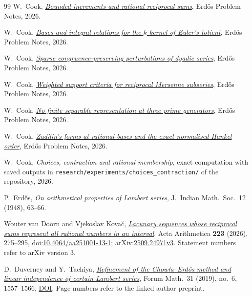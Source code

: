 \documentclass[11pt]{article}
\begin{document}
\begin{thebibliography}{99}
 W.~Cook,
  \href{erdos-243-reciprocal-tail-rigidity.pdf}{\emph{Bounded
  increments and rational reciprocal sums}}, Erd\H{o}s Problem Notes, 2026.

 W.~Cook,
  \href{erdos-249-binary-totient-series.pdf}{\emph{Bases and
  integral relations for the $k$-kernel of Euler's totient}}, Erd\H{o}s Problem
  Notes, 2026.

 W.~Cook,
  \href{erdos-251-prime-gap-dyadic-series.pdf}{\emph{Sparse
  congruence-preserving perturbations of dyadic series}}, Erd\H{o}s Problem
  Notes, 2026.

 W.~Cook,
  \href{erdos-257-mersenne-support-subseries.pdf}{\emph{Weighted
  support criteria for reciprocal Mersenne subseries}}, Erd\H{o}s Problem Notes,
  2026.

 W.~Cook,
  \href{erdos-269-three-prime-running-lcm.pdf}{\emph{No
  finite separable representation at three prime generators}}, Erd\H{o}s Problem
  Notes, 2026.

 W.~Cook,
  \href{erdos-1049-rational-base-lambert.pdf}{\emph{Zudilin's
  forms at rational bases and the exact normalised Hankel order}}, Erd\H{o}s
  Problem Notes, 2026.

 W.~Cook,
  \emph{Choices, contraction and rational membership}, exact computation with saved outputs in \texttt{research/experiments/choices\_contraction/} of the repository,
  2026.

 P.~Erd\H{o}s, \emph{On arithmetical properties of Lambert
  series}, J.~Indian Math.\ Soc.\ 12 (1948), 63--66.

 Wouter van Doorn and Vjekoslav Kova\v{c}, \href{https://arxiv.org/abs/2509.24971v3}{\emph{Lacunary sequences whose reciprocal sums represent all rational numbers in an interval}}.
  Acta Arithmetica \textbf{223} (2026), 275--295, doi:\href{https://doi.org/10.4064/aa251001-13-1}{10.4064/aa251001-13-1}; arXiv:\href{https://arxiv.org/abs/2509.24971v3}{2509.24971v3}. Statement numbers refer to arXiv version 3.

 D.~Duverney and Y.~Tachiya,
  \href{https://danielduverney.fr/documents/theorie-des-nombres/DuverneyTachiya190522.pdf}
  {\emph{Refinement of the Chowla--Erd\H{o}s method and linear independence
  of certain Lambert series}},
  Forum Math.\ 31 (2019), no.~6, 1557--1566,
  \href{https://doi.org/10.1515/forum-2018-0299}{DOI}.  Page numbers refer to
  the linked author preprint.


\end{thebibliography}
\end{document}
